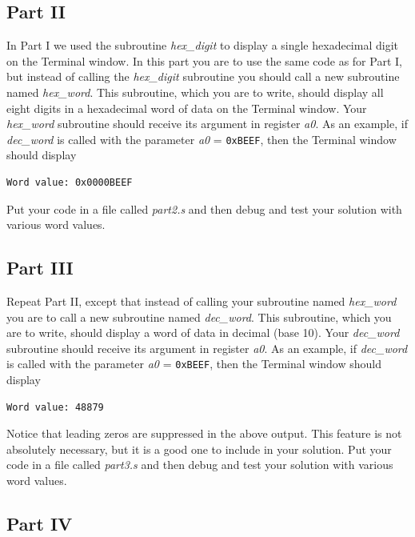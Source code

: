 \documentclass[epsfig,10pt,fullpage]{article}
\begin{document}
\subsection*{Part II}

In Part I we used the subroutine {\it hex\_digit} to display a single hexadecimal digit on 
the Terminal window. In this part you are to use the same code as for Part I, but instead of 
calling the {\it hex\_digit} subroutine you should call a new subroutine named {\it hex\_word}.
This subroutine, which you are to write, should display all eight digits in a hexadecimal
word of data on the Terminal window. Your {\it hex\_word} subroutine should receive its
argument in register {\it a0}. As an example, if {\it dec\_word} is called with the
parameter {\it a0} = \texttt{0xBEEF}, then the Terminal window should display

\begin{verbatim}
Word value: 0x0000BEEF
\end{verbatim}

Put your code in a file called {\it part2.s} and then debug and test your solution with
various word values. 

\newpage
\subsection*{Part III}

Repeat Part II, except that instead of calling your subroutine named {\it hex\_word} you are to
call a new subroutine named {\it dec\_word}. 
This subroutine, which you are to write, should display a word of data in decimal (base 10).
Your {\it dec\_word} subroutine should receive its argument in register {\it a0}. As an example,
if {\it dec\_word} is called with the parameter {\it a0} = \texttt{0xBEEF}, then the 
Terminal window should display

\begin{verbatim}
Word value: 48879 
\end{verbatim}

Notice that leading zeros are suppressed in the above output. This feature is not
absolutely necessary, but it is a good one to include in your solution. 
Put your code in a file called {\it part3.s} and then debug and test your solution with
various word values. 

\subsection*{Part IV}
\end{document}
